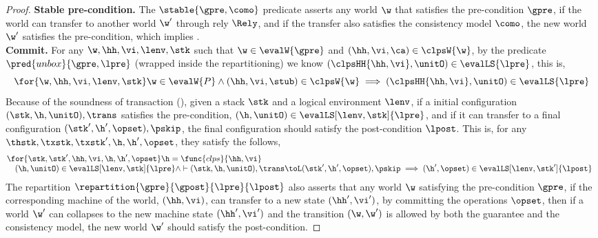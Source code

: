 \begin{proof}
\textbf{Stable pre-condition.} 
The \( \stable{\gpre, \como} \) predicate asserts any world \( \w \) that satisfies the pre-condition \( \gpre \), if the world can transfer to another world \( \w' \) through rely \( \Rely \), and if the transfer also satisfies the consistency model \( \como \), the new world \( \w' \) satisfies the pre-condition, which implies . 
\\
\textbf{Commit.}
For any \( \w, \hh, \vi, \lenv, \stk \) such that \( \w \in \evalW{\gpre} \) and \( (\hh, \vi, \ca) \in \clpsW{\w} \), by the predicate \( \pred{unbox}{\gpre, \lpre} \) (wrapped inside the repartitioning) we know \( (\clpsHH{\hh, \vi}, \unitO) \in \evalLS{\lpre} \), this is,
\begin{equation}
\label{equ:local-pre-condition}
\for{\w, \hh, \vi, \lenv, \stk} \w \in \evalW{P} \land (\hh, \vi, \stub) \in \clpsW{\w} \implies (\clpsHH{\hh, \vi}, \unitO) \in \evalLS{\lpre}
\end{equation}
Because of the soundness of transaction (), given a stack \( \stk \) and a logical environment \( \lenv \), if a initial configuration \( (\stk, \h, \unitO), \trans \) satisfies the pre-condition, \ie \( (\h, \unitO) \in \evalLS[\lenv,\stk]{\lpre} \), and if it can transfer to a final configuration \( (\stk', \h', \opset), \pskip \), the final configuration should satisfy the post-condition \( \lpost \).
This is, for any \( \thstk, \txstk, \txstk', \h, \h', \opset \), they satisfy the follows,
\begin{equation}
\label{equ:local-transaction-sound}
\begin{array}{@{}l}
    \for{\stk, \stk', \hh, \vi, \h, \h', \opset} 
    \h = \func{clps}{\hh,\vi} \\
    \quad (\h, \unitO) \in \evalLS[\lenv,\stk]{\lpre}
    \land \vdash (\stk, \h, \unitO), \trans \toL (\stk', \h', \opset), \pskip
    \implies (\h', \opset) \in \evalLS[\lenv,\stk']{\lpost}
\end{array}
\end{equation}
The repartition \( \repartition{\gpre}{\gpost}{\lpre}{\lpost} \) also asserts that any world \( \w \) satisfying the pre-condition \( \gpre \), if the corresponding machine of the world, \ie \( (\hh, \vi) \), can transfer to a new state \( (\hh',\vi') \), by committing the operations \( \opset \), then if a world \( \w' \) can collapses to the new machine state \( (\hh',\vi') \) and the transition \( (\w, \w') \) is allowed by both the guarantee and the consistency model, the new world \( \w' \) should satisfy the post-condition.

\end{proof}
